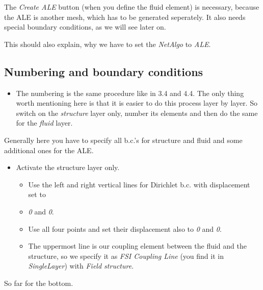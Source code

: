 The \emph{Create ALE} button (when you define the fluid element) is
necessary, because the ALE is another mesh, which has to be generated
seperately. It also needs special boundary conditions, as we will
see later on.

This should also explain, why we have to set the \emph{NetAlgo} to
\emph{ALE}.


\subsection{Numbering and boundary conditions}

\begin{itemize}
\item The numbering is the same procedure like in 3.4 and 4.4. The only
thing worth mentioning here is that it is easier to do this process
layer by layer. So switch on the \emph{structure} layer only, number
its elements and then do the same for the \emph{fluid} layer.
\end{itemize}
Generally here you have to specify all b.c.'s for structure and fluid
and some additional ones for the ALE.

\begin{itemize}
\item Activate the structure layer only. 

\begin{itemize}
\item Use the left and right vertical lines for Dirichlet b.c. with displacement
set to 
\item \emph{0} and \emph{0}. 
\item Use all four points and set their displacement also to \emph{0} and
\emph{0}.
\item The uppermost line is our coupling element between the fluid and the
structure, so we specify it as \emph{FSI Coupling Line} (you find
it in \emph{SingleLayer}) with \emph{Field structure}.
\end{itemize}
\end{itemize}
So far for the bottom.

